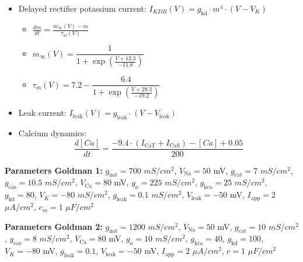 \documentclass[../main.tex]{subfiles}
\begin{document}
\begin{itemize}
    \item Delayed rectifier potassium current:
    $I_{KDR}(V) = g_{\text{kd}} \cdot m^4 \cdot (V - V_K)$
    \begin{itemize}[label=\textopenbullet]
        \item $\frac{dm}{dt} = \frac{m_\infty(V) - m}{\tau_m(V)}$
        \item $m_\infty(V) = \dfrac{1}{1 + \exp\left(\frac{V + 12.3}{-11.8}\right)}$
        \item $\tau_m(V)= 7.2 - \dfrac{6.4}{1 + \exp\left(\frac{V + 28.3}{-19.2}\right)}$
    \end{itemize}

    \item Leak current:
    $I_{\text{leak}}(V) = g_{\text{leak}} \cdot (V - V_{\text{leak}})$

    \item Calcium dynamics:
    \[
    \frac{d[Ca]}{dt} = \frac{-9.4 \cdot (I_{\text{CaT}} + I_{\text{CaS}}) - [Ca] + 0.05}{200}
    \]
\end{itemize}

\vspace{0.5em}
\textbf{Parameters Goldman 1:}
$g_{\text{nat}} = 700$ $mS/cm^2$, $V_{\text{Na}} = 50$ mV, $g_{\text{cat}} = 7$ $mS/cm^2$, $g_{\text{cas}} = 10.5$ $mS/cm^2$,
$V_{\text{Ca}} = 80$ mV, $g_a = 225$ $mS/cm^2$, $g_{\text{kca}} = 25$ $mS/cm^2$, $g_{\text{kd}} = 80$, $V_K = -80$ $mS/cm^2$,
$g_{\text{leak}} = 0.1$ $mS/cm^2$, $V_{\text{leak}} = -50$ mV, $I_{\text{app}} = 2$ $\mu A/cm^2$, $c_m = 1$ $\mu F / cm^2$

\textbf{Parameters Goldman 2:}
$g_{\text{nat}} = 1200$ $mS/cm^2$, $V_{\text{Na}} = 50$ mV, $g_{\text{cat}} = 10$ $mS/cm^2$, $g_{\text{cas}} = 8$ $mS/cm^2$,
$V_{\text{Ca}} = 80$ mV, $g_a = 10$ $mS/cm^2$, $g_{\text{kca}} = 40$, $g_{\text{kd}} = 100$, $V_K = -80$ mV,
$g_{\text{leak}} = 0.1$, $V_{\text{leak}} = -50$ mV, $I_{\text{app}} = 2$ $\mu A/cm^2$, $c = 1$ $\mu F / cm^2$
\end{document}
